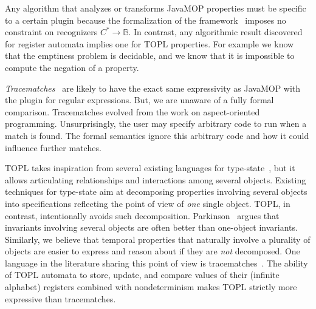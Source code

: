 \documentclass[9pt, preprint]{sigplanconf} %
\newcommand{\B}{\ensuremath{\mathbb{B}}}
\theoremstyle{definition}
\theoremstyle{remark}
\begin{document}
Any algorithm that analyzes or transforms JavaMOP properties must be specific to a certain plugin because the formalization of the framework~\cite{dblp:journals/corr/abs-1112-5761} imposes no constraint on recognizers $C^*\to\B$.
In contrast, any algorithmic result discovered for register automata implies one for TOPL properties.
For example we know that the emptiness problem is decidable, and we know that it is impossible to compute the negation of a property.

{\it Tracematches\/}~\cite{dblp:conf/oopsla/allanachklmsst05} are likely to have the exact same expressivity as JavaMOP with the plugin for regular expressions.
But, we are unaware of a fully formal comparison.
Tracematches evolved from the work on aspect-oriented programming.
Unsurprisingly, the user may specify arbitrary code to run when a match is found.
The formal semantics ignore this arbitrary code and how it could influence further matches.


TOPL takes inspiration from several existing  languages for type-state~\cite{strom1986,dblp:conf/oopsla/bierhoffa07,dblp:conf/oopsla/naeeml08,disney2011,ball2002}, but  it allows articulating  relationships and interactions among several objects.
Existing techniques for type-state aim at decomposing properties involving several objects into specifications reflecting the point of view of {\em one} single object.
TOPL, in contrast,  intentionally avoids such decomposition.
Parkinson~\cite{parkinson-iwaco2007} argues that invariants involving several objects are often better than one-object invariants.
Similarly, we believe that temporal properties that naturally involve a plurality of objects are easier to express and reason about if they are \emph{not} decomposed.
One language in the literature sharing this point of view is tracematches~\cite{dblp:conf/oopsla/allanachklmsst05}.
The ability of TOPL automata to store,  update, and compare values of their (infinite alphabet) registers combined with nondeterminism makes TOPL strictly more expressive than tracematches.
\end{document}
